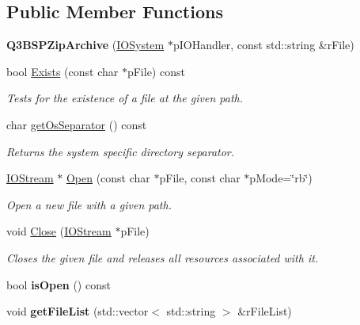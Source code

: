 \subsection*{Public Member Functions}
\begin{DoxyCompactItemize}
\item 
\hypertarget{class_assimp_1_1_q3_b_s_p_1_1_q3_b_s_p_zip_archive_a0ff95d5fc19dafc92c02822fa023969c}{{\bfseries Q3\+B\+S\+P\+Zip\+Archive} (\hyperlink{class_assimp_1_1_i_o_system}{I\+O\+System} $\ast$p\+I\+O\+Handler, const std\+::string \&r\+File)}\label{class_assimp_1_1_q3_b_s_p_1_1_q3_b_s_p_zip_archive_a0ff95d5fc19dafc92c02822fa023969c}

\item 
bool \hyperlink{class_assimp_1_1_q3_b_s_p_1_1_q3_b_s_p_zip_archive_a0da864ba3be82e73c22bb4f6c3f97b3c}{Exists} (const char $\ast$p\+File) const 
\begin{DoxyCompactList}\small\item\em Tests for the existence of a file at the given path. \end{DoxyCompactList}\item 
char \hyperlink{class_assimp_1_1_q3_b_s_p_1_1_q3_b_s_p_zip_archive_afc79d5a05463a8899915e03e320dde28}{get\+Os\+Separator} () const 
\begin{DoxyCompactList}\small\item\em Returns the system specific directory separator. \end{DoxyCompactList}\item 
\hyperlink{class_assimp_1_1_i_o_stream}{I\+O\+Stream} $\ast$ \hyperlink{class_assimp_1_1_q3_b_s_p_1_1_q3_b_s_p_zip_archive_a23adb8c87f7085d120e0ebdadcb87bce}{Open} (const char $\ast$p\+File, const char $\ast$p\+Mode=\char`\"{}rb\char`\"{})
\begin{DoxyCompactList}\small\item\em Open a new file with a given path. \end{DoxyCompactList}\item 
void \hyperlink{class_assimp_1_1_q3_b_s_p_1_1_q3_b_s_p_zip_archive_a3d604ffde1cc906a7a0a24daebe7d4a0}{Close} (\hyperlink{class_assimp_1_1_i_o_stream}{I\+O\+Stream} $\ast$p\+File)
\begin{DoxyCompactList}\small\item\em Closes the given file and releases all resources associated with it. \end{DoxyCompactList}\item 
\hypertarget{class_assimp_1_1_q3_b_s_p_1_1_q3_b_s_p_zip_archive_adec60b9388871445043f2079eb2f5889}{bool {\bfseries is\+Open} () const }\label{class_assimp_1_1_q3_b_s_p_1_1_q3_b_s_p_zip_archive_adec60b9388871445043f2079eb2f5889}

\item 
\hypertarget{class_assimp_1_1_q3_b_s_p_1_1_q3_b_s_p_zip_archive_ac209cf208b1fb9fcca469a45d37b26fb}{void {\bfseries get\+File\+List} (std\+::vector$<$ std\+::string $>$ \&r\+File\+List)}\label{class_assimp_1_1_q3_b_s_p_1_1_q3_b_s_p_zip_archive_ac209cf208b1fb9fcca469a45d37b26fb}

\end{DoxyCompactItemize}
